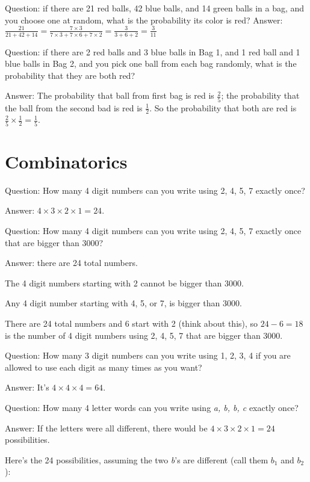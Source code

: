 \documentclass[fullpage,twocolumn]{article}
\newcommand{\vp}{{\vspace{0.1in}}}
\begin{document}
Question: if there are 21 red balls, 42 blue balls, and 14 green balls 
in a bag, and you choose one at random, what is 
the probability its color is red?
\vp
Answer: $\frac{21}{21+42+14} = \frac{7\times3}{7\times 3 + 7 \times 6 + 7 \times 2} = \frac{3}{3+6+2} = \frac{3}{11}$


Question: if there are 2 red balls and 3 blue balls in Bag 1, and 1 red ball and 1 blue balls in Bag 2, and
you pick one ball from each bag randomly, what is the probability that they are both red?

\vp
Answer: The probability that ball from first bag is red is $\frac{2}{5}$; the probability that
the ball from the second bad is red is $\frac{1}{2}$. So the probability that both are red
is $\frac{2}{5}\times \frac{1}{2} = \frac{1}{5}$.

\section{Combinatorics}

Question: How many 4 digit numbers can you write using 2, 4, 5, 7 exactly once?

\vp
Answer: $4 \times 3 \times 2 \times 1 = 24$.

Question: How many 4 digit numbers can you write using 2, 4, 5, 7 exactly once that are bigger than 3000?

\vp
Answer: there are 24 total numbers. 

The 4 digit numbers starting with 2 cannot be bigger than 3000.

Any 4 digit number starting with 4, 5, or 7, is bigger than 3000.

There are 24 total numbers and 6 start with 2 (think about this), so $24-6=18$ is
the number of 4 digit numbers using 2, 4, 5, 7 that are bigger than 3000.

Question: How many 3 digit numbers can you write using 1, 2, 3, 4 if you are
allowed to use each digit as many times as you want?

\vp
Answer: It's $4 \times 4 \times 4 = 64$.

Question: How many 4 letter words can you write using {\em a, b, b, c} exactly once?

\vp
Answer: If the letters were all different, there would be $4 \times 3 \times 2
\times 1 = 24$ possibilities. 

Here's the 24 possibilities, assuming the two {\em b}'s are different (call
them $b_1$ and $b_2$):
\end{document}
